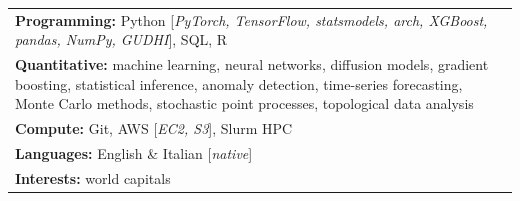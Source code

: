 \documentclass[a4paper,10pt]{article}
\newlength{\sectionlabelwidth}
\newlength{\sectionlabelsep}
\newenvironment{sideSection}[1]{
  \vspace{2.2mm}
  \begin{list}{}{
    \setlength{\leftmargin}{\dimexpr\sectionlabelwidth+\sectionlabelsep\relax}
    \setlength{\labelwidth}{\sectionlabelwidth}
    \setlength{\labelsep}{\sectionlabelsep}
    \setlength{\topsep}{0pt}
    \setlength{\partopsep}{0pt}
    \setlength{\parsep}{0pt}
    \setlength{\itemsep}{0pt}
  }
  \item[{\raisebox{0pt}[\height][0pt]{\parbox[t]{\sectionlabelwidth}{\raggedright\bfseries\small\MakeUppercase{#1}}}}]
  \vspace{-0.6mm}
}{
  \end{list}
}
\begin{document}
\begin{sideSection}{Skills \& Languages}
{\small
\begin{tabular}[t]{@{}p{\linewidth}@{}}
\textbf{Programming:}
Python [\emph{PyTorch, TensorFlow, statsmodels, arch, XGBoost, pandas, NumPy, GUDHI}],
SQL,
R
\\[0.5mm]
\textbf{Quantitative:}
machine learning,
neural networks,
diffusion models,
gradient boosting,
statistical inference,
anomaly detection,
time-series forecasting,
Monte Carlo methods,
stochastic point processes,
topological data analysis
\\[0.5mm]
\textbf{Compute:} Git, AWS [\emph{EC2, S3}], Slurm HPC\\[0.5mm]
\textbf{Languages:} English \& Italian [\emph{native}]\\[0.5mm]
\textbf{Interests:} world capitals
\end{tabular}
}
\end{sideSection}
\end{document}
